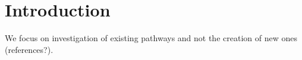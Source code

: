 \chapter{Introduction}

We focus on investigation of existing pathways and not the creation of new ones (references?).
